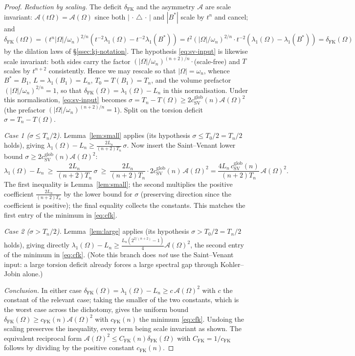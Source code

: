 \documentclass[11pt]{amsart}
\theoremstyle{definition}
\newcommand{\Om}{\Omega}
\newcommand{\Fr}{\mathcal A}
\newcommand{\abs}[1]{\left|#1\right|}
\begin{document}
\begin{proof}
\emph{Reduction by scaling.} The deficit $\delta_{\mathrm{FK}}$ and the
asymmetry $\Fr$ are scale invariant: $\Fr(t\Om)=\Fr(\Om)$ since both
$\abs{\,\cdot\,\triangle\,\cdot\,}$ and $\abs{B^*}$ scale by $t^n$ and cancel;
and $\delta_{\mathrm{FK}}(t\Om)=(t^n\abs\Om/\omega_n)^{2/n}
(t^{-2}\lambda_1(\Om)-t^{-2}\lambda_1(B^*))
=t^2(\abs\Om/\omega_n)^{2/n}\cdot t^{-2}(\lambda_1(\Om)-\lambda_1(B^*))
=\delta_{\mathrm{FK}}(\Om)$ by the dilation laws of \S\ref{ssec:kj-notation}.
The hypothesis \eqref{eq:sv-input} is likewise scale invariant: both sides
carry the factor $(\abs\Om/\omega_n)^{(n+2)/n}\cdot$(scale-free) and $T$
scales by $t^{n+2}$ consistently. Hence we may rescale so that
$\abs\Om=\omega_n$, whence $B^*=B_1$, $L=\lambda_1(B_1)=L_n$,
$T_0=T(B_1)=T_n$, and the volume prefactor $(\abs\Om/\omega_n)^{2/n}=1$, so
that $\delta_{\mathrm{FK}}(\Om)=\lambda_1(\Om)-L_n$ in this normalisation.
Under this normalisation, \eqref{eq:sv-input} becomes
$\sigma=T_n-T(\Om)\ge2c_{\mathrm{SV}}^{\mathrm{glob}}(n)\Fr(\Om)^2$ (the
prefactor $(\abs\Om/\omega_n)^{(n+2)/n}=1$). Split on the torsion deficit
$\sigma=T_n-T(\Om)$.

\emph{Case 1 ($\sigma\le T_n/2$).} Lemma~\ref{lem:small} applies (its
hypothesis $\sigma\le T_0/2=T_n/2$ holds), giving $\lambda_1(\Om)-L_n\ge
\tfrac{2L_n}{(n+2)T_n}\,\sigma$. Now insert the Saint--Venant lower bound
$\sigma\ge2c_{\mathrm{SV}}^{\mathrm{glob}}(n)\Fr(\Om)^2$:
\[
  \lambda_1(\Om)-L_n
  \ \ge\ \frac{2L_n}{(n+2)T_n}\,\sigma
  \ \ge\ \frac{2L_n}{(n+2)T_n}\cdot 2c_{\mathrm{SV}}^{\mathrm{glob}}(n)
     \,\Fr(\Om)^2
  =\frac{4L_n\,c_{\mathrm{SV}}^{\mathrm{glob}}(n)}{(n+2)T_n}\,\Fr(\Om)^2 .
\]
The first inequality is Lemma~\ref{lem:small}; the second multiplies the
positive coefficient $\tfrac{2L_n}{(n+2)T_n}$ by the lower bound for
$\sigma$ (preserving direction since the coefficient is positive); the final
equality collects the constants. This matches the first entry of the minimum
in \eqref{eq:cfk}.

\emph{Case 2 ($\sigma>T_n/2$).} Lemma~\ref{lem:large} applies (its
hypothesis $\sigma>T_0/2=T_n/2$ holds), giving directly
$\lambda_1(\Om)-L_n\ge\frac{L_n(2^{2/(n+2)}-1)}{4}\Fr(\Om)^2$, the second
entry of the minimum in \eqref{eq:cfk}. (Note this branch does \emph{not}
use the Saint--Venant input: a large torsion deficit already forces a large
spectral gap through Kohler--Jobin alone.)

\emph{Conclusion.} In either case
$\delta_{\mathrm{FK}}(\Om)=\lambda_1(\Om)-L_n\ge c\,\Fr(\Om)^2$ with $c$ the
constant of the relevant case; taking the smaller of the two constants,
which is the worst case across the dichotomy, gives the uniform bound
$\delta_{\mathrm{FK}}(\Om)\ge c_{\mathrm{FK}}(n)\Fr(\Om)^2$ with
$c_{\mathrm{FK}}(n)$ the minimum \eqref{eq:cfk}. Undoing the scaling
preserves the inequality, every term being scale invariant as shown. The
equivalent reciprocal form $\Fr(\Om)^2\le C_{\mathrm{FK}}(n)
\delta_{\mathrm{FK}}(\Om)$ with $C_{\mathrm{FK}}=1/c_{\mathrm{FK}}$ follows by
dividing by the positive constant $c_{\mathrm{FK}}(n)$.
\end{proof}
\end{document}
